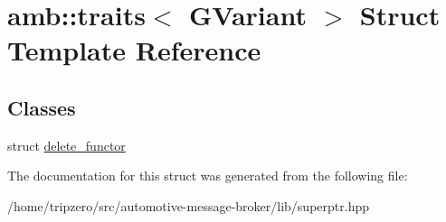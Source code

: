 \hypertarget{structamb_1_1traits_3_01GVariant_01_4}{\section{amb\-:\-:traits$<$ G\-Variant $>$ Struct Template Reference}
\label{structamb_1_1traits_3_01GVariant_01_4}
}
\subsection*{Classes}
\begin{DoxyCompactItemize}
\item 
struct \hyperlink{structamb_1_1traits_3_01GVariant_01_4_1_1delete__functor}{delete\-\_\-functor}
\end{DoxyCompactItemize}


The documentation for this struct was generated from the following file\-:\begin{DoxyCompactItemize}
\item 
/home/tripzero/src/automotive-\/message-\/broker/lib/superptr.\-hpp\end{DoxyCompactItemize}
